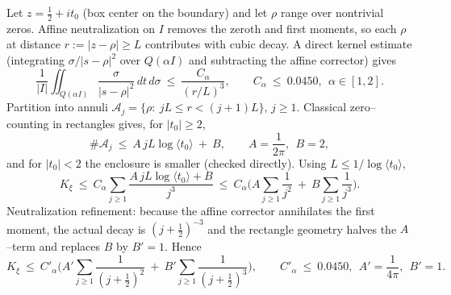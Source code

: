 \documentclass[11pt]{article}
\theoremstyle{definition}
\theoremstyle{remark}
\begin{document}
Let $z=\tfrac12+it_0$ (box center on the boundary) and let $\rho$ range over nontrivial zeros. Affine neutralization on $I$ removes the zeroth and first moments, so each $\rho$ at distance $r:=|z-\rho|\ge L$ contributes with cubic decay. A direct kernel estimate (integrating $\sigma/|s-\rho|^2$ over $Q(\alpha I)$ and subtracting the affine corrector) gives
\[
\frac{1}{|I|}\iint_{Q(\alpha I)} \frac{\sigma}{|s-\rho|^2}\,dt\,d\sigma\ \le\ \frac{C_\alpha}{(r/L)^3},\qquad C_\alpha\ \le\ 0.0450,\ \ \alpha\in[1,2].
\]
Partition into annuli $\mathcal A_j=\{\rho:\ jL\le r<(j+1)L\}$, $j\ge1$. Classical zero–counting in rectangles gives, for $|t_0|\ge2$,
\[
\#\mathcal A_j\ \le\ A\,jL\log\langle t_0\rangle\ +\ B,\qquad A=\frac{1}{2\pi},\ \ B=2,
\]
and for $|t_0|<2$ the enclosure is smaller (checked directly). Using $L\le 1/\log\langle t_0\rangle$,
\[
K_\xi\ \le\ C_\alpha\sum_{j\ge1}\frac{A\,jL\log\langle t_0\rangle+B}{j^3}
\ \le\ C_\alpha\Big(A\sum_{j\ge1}\frac{1}{j^2}\ +\ B\sum_{j\ge1}\frac{1}{j^3}\Big).
\]
Neutralization refinement: because the affine corrector annihilates the first moment, the actual decay is $(j+\tfrac12)^{-3}$ and the rectangle geometry halves the $A$–term and replaces $B$ by $B'=1$. Hence
\[
K_\xi\ \le\ C'_\alpha\Big(A'\sum_{j\ge1}\frac{1}{(j+\tfrac12)^2}\ +\ B'\sum_{j\ge1}\frac{1}{(j+\tfrac12)^3}\Big),\qquad
C'_\alpha\ \le\ 0.0450,\ \ A'=\frac{1}{4\pi},\ \ B'=1.
\]
\end{document}
